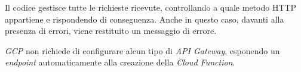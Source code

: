 Il codice gestisce tutte le richieste ricevute, controllando a quale metodo HTTP appartiene e rispondendo di conseguenza. Anche in questo caso, davanti alla presenza di errori, viene restituito un messaggio di errore.

\textit{GCP} non richiede di configurare alcun tipo di \textit{API Gateway}, esponendo un \textit{endpoint} automaticamente alla creazione della \textit{Cloud Function}.